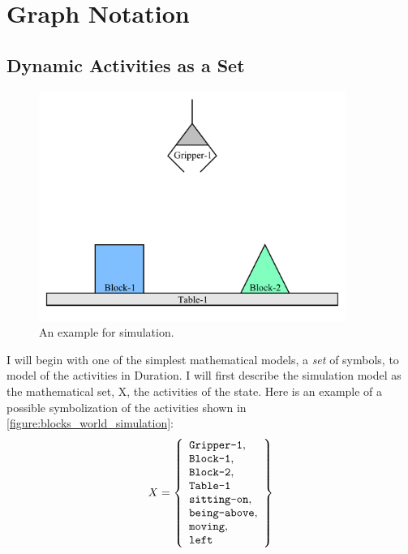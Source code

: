 \chapter{Graph Notation}
\label{chapter:graph_notation}

\section{Dynamic Activities as a Set}

\begin{figure}
\includegraphics[width=10cm]{gfx/blocks_world_simulation}
\caption{An example for simulation.}
\label{figure:blocks_world_simulation}
\end{figure}

I will begin with one of the simplest mathematical models, a
\emph{set} of symbols, to model of the activities in Duration.  I will
first describe the simulation model as the mathematical set, X, the
activities of the state.  Here is an example of a possible
symbolization of the activities shown in
{\mbox{\autoref{figure:blocks_world_simulation}}}:
\begin{equation}
\label{equation:example_initial_state}
X =
  \left\{
    \begin{array}{l}
      \text{{\tt{Gripper-1}}}, \\
      \text{{\tt{Block-1}}}, \\
      \text{{\tt{Block-2}}}, \\
      \text{{\tt{Table-1}}} \\
      \text{{\tt{sitting-on}}}, \\
      \text{{\tt{being-above}}}, \\
      \text{{\tt{moving}}}, \\
      \text{{\tt{left}}}
    \end{array}
  \right\}
\end{equation}

